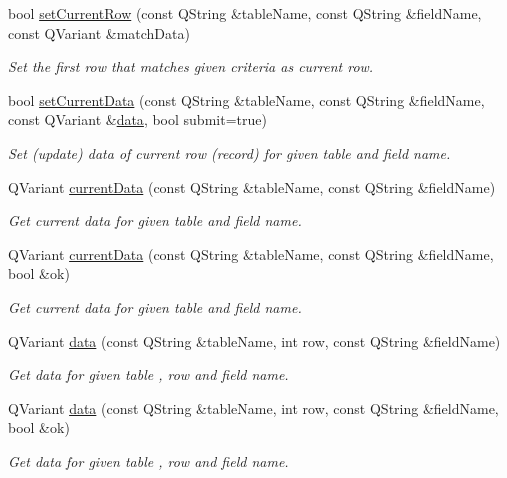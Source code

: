 \begin{DoxyCompactItemize}
bool \hyperlink{classmdt_sql_form_abd4c01483812a53edc4be116a7dd2612}{set\-Current\-Row} (const Q\-String \&table\-Name, const Q\-String \&field\-Name, const Q\-Variant \&match\-Data)
\begin{DoxyCompactList}\small\item\em Set the first row that matches given criteria as current row. \end{DoxyCompactList}\item 
bool \hyperlink{classmdt_sql_form_aa377e70f4a2e865b0b696957c0fca766}{set\-Current\-Data} (const Q\-String \&table\-Name, const Q\-String \&field\-Name, const Q\-Variant \&\hyperlink{classmdt_sql_form_a0c27d6a9ecbf0589f313c7193c632a62}{data}, bool submit=true)
\begin{DoxyCompactList}\small\item\em Set (update) data of current row (record) for given table and field name. \end{DoxyCompactList}\item 
Q\-Variant \hyperlink{classmdt_sql_form_aca283557b7e2586779cb5c498d388f14}{current\-Data} (const Q\-String \&table\-Name, const Q\-String \&field\-Name)
\begin{DoxyCompactList}\small\item\em Get current data for given table and field name. \end{DoxyCompactList}\item 
Q\-Variant \hyperlink{classmdt_sql_form_af24711f9c18a1009352b62d47b9758d7}{current\-Data} (const Q\-String \&table\-Name, const Q\-String \&field\-Name, bool \&ok)
\begin{DoxyCompactList}\small\item\em Get current data for given table and field name. \end{DoxyCompactList}\item 
Q\-Variant \hyperlink{classmdt_sql_form_a0c27d6a9ecbf0589f313c7193c632a62}{data} (const Q\-String \&table\-Name, int row, const Q\-String \&field\-Name)
\begin{DoxyCompactList}\small\item\em Get data for given table , row and field name. \end{DoxyCompactList}\item 
Q\-Variant \hyperlink{classmdt_sql_form_ab0c251a35567dd34f244fea715a7a3d4}{data} (const Q\-String \&table\-Name, int row, const Q\-String \&field\-Name, bool \&ok)
\begin{DoxyCompactList}\small\item\em Get data for given table , row and field name. \end{DoxyCompactList}\item 

\end{DoxyCompactItemize}
